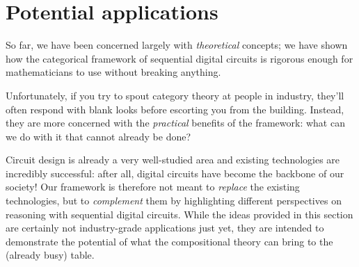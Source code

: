 \chapter{Potential applications}\label{sec:semantics-applications}

So far, we have been concerned largely with \emph{theoretical} concepts; we have
shown how the categorical framework of sequential digital circuits is rigorous
enough for mathematicians to use without breaking anything.

Unfortunately, if you try to spout category theory at people in industry,
they'll often respond with blank looks before escorting you from the
building.
Instead, they are more concerned with the \emph{practical} benefits of the
framework: what can we do with it that cannot already be done?

Circuit design is already a very well-studied area and existing technologies are
incredibly successful: after all, digital circuits have become the backbone of
our society!
Our framework is therefore not meant to \emph{replace} the existing
technologies, but to \emph{complement} them by highlighting different
perspectives on reasoning with sequential digital circuits.
While the ideas provided in this section are certainly not industry-grade
applications just yet, they are intended to demonstrate the potential of what
the compositional theory can bring to the (already busy) table.








